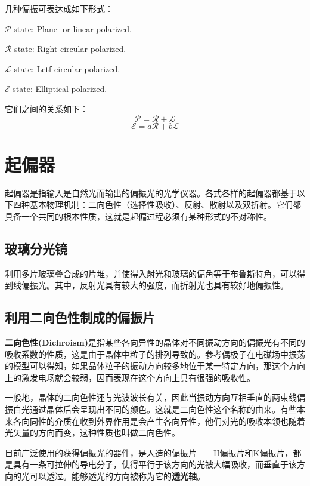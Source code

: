 \documentclass[UTF8]{ctexart}
\newcommand{\backdoc}{\normalsize}
\begin{document}
	几种偏振可表达成如下形式：
	
	$\mathscr{P}$-state: Plane- or linear-polarized.
	
	$\mathscr{R}$-state: Right-circular-polarized.

	$\mathscr{L}$-state: Letf-circular-polarized.
	
	$\mathscr{E}$-state: Elliptical-polarized.
	
	它们之间的关系如下：
	\begin{equation}
	\mathscr{P}=\mathscr{R}+\mathscr{L}
	\end{equation}
	\begin{equation}
	\mathscr{E}=a\mathscr{R}+b\mathscr{L}
	\end{equation}
	
	\section{起偏器}
	起偏器是指输入是自然光而输出的偏振光的光学仪器。各式各样的起偏器都基于以下四种基本物理机制：二向色性（选择性吸收）、反射、散射以及双折射。它们都具备一个共同的根本性质，这就是起偏过程必须有某种形式的不对称性。
	
	\subsection{玻璃分光镜}
	
	\backdoc
	利用多片玻璃叠合成的片堆，并使得入射光和玻璃的偏角等于布鲁斯特角，可以得到线偏振光。其中，反射光具有较大的强度，而折射光也具有较好地偏振性。
	
	\subsection{利用二向色性制成的偏振片}
	
	\backdoc
	\textbf{二向色性(Dichroism)}是指某些各向异性的晶体对不同振动方向的偏振光有不同的吸收系数的性质，这是由于晶体中粒子的排列导致的。参考偶极子在电磁场中振荡的模型可以得知，如果晶体粒子的振动方向较多地位于某一特定方向，那这个方向上的激发电场就会较弱，因而表现在这个方向上具有很强的吸收性。
	
	一般地，晶体的二向色性还与光波波长有关，因此当振动方向互相垂直的两束线偏振白光通过晶体后会呈现出不同的颜色。这就是二向色性这个名称的由来。有些本来各向同性的介质在收到外界作用是会产生各向异性，他们对光的吸收本领也随着光矢量的方向而变，这种性质也叫做二向色性。
	
	目前广泛使用的获得偏振光的器件，是人造的偏振片——H偏振片和K偏振片，都是具有一条可拉伸的导电分子，使得平行于该方向的光被大幅吸收，而垂直于该方向的光可以透过。能够透光的方向被称为它的\textbf{透光轴}。
	
\end{document}
